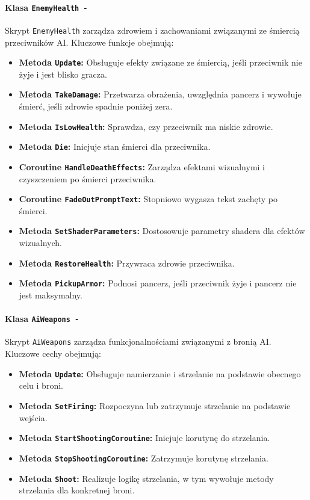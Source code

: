 \paragraph{Klasa \texttt{EnemyHealth -}}
Skrypt \texttt{EnemyHealth} zarządza zdrowiem i zachowaniami związanymi ze śmiercią przeciwników AI. Kluczowe funkcje obejmują:
\begin{itemize}
\item \textbf{Metoda \texttt{Update}:} Obsługuje efekty związane ze śmiercią, jeśli przeciwnik nie żyje i jest blisko gracza.
\item \textbf{Metoda \texttt{TakeDamage}:} Przetwarza obrażenia, uwzględnia pancerz i wywołuje śmierć, jeśli zdrowie spadnie poniżej zera.
\item \textbf{Metoda \texttt{IsLowHealth}:} Sprawdza, czy przeciwnik ma niskie zdrowie.
\item \textbf{Metoda \texttt{Die}:} Inicjuje stan śmierci dla przeciwnika.
\item \textbf{Coroutine \texttt{HandleDeathEffects}:} Zarządza efektami wizualnymi i czyszczeniem po śmierci przeciwnika.
\item \textbf{Coroutine \texttt{FadeOutPromptText}:} Stopniowo wygasza tekst zachęty po śmierci.
\item \textbf{Metoda \texttt{SetShaderParameters}:} Dostosowuje parametry shadera dla efektów wizualnych.
\item \textbf{Metoda \texttt{RestoreHealth}:} Przywraca zdrowie przeciwnika.
\item \textbf{Metoda \texttt{PickupArmor}:} Podnosi pancerz, jeśli przeciwnik żyje i pancerz nie jest maksymalny.
\end{itemize}

\paragraph{Klasa \texttt{AiWeapons -}}
Skrypt \texttt{AiWeapons} zarządza funkcjonalnościami związanymi z bronią AI. Kluczowe cechy obejmują:
\begin{itemize}
\item \textbf{Metoda \texttt{Update}:} Obsługuje namierzanie i strzelanie na podstawie obecnego celu i broni.
\item \textbf{Metoda \texttt{SetFiring}:} Rozpoczyna lub zatrzymuje strzelanie na podstawie wejścia.
\item \textbf{Metoda \texttt{StartShootingCoroutine}:} Inicjuje korutynę do strzelania.
\item \textbf{Metoda \texttt{StopShootingCoroutine}:} Zatrzymuje korutynę strzelania.
\item \textbf{Metoda \texttt{Shoot}:} Realizuje logikę strzelania, w tym wywołuje metody strzelania dla konkretnej broni.
\end{itemize}

